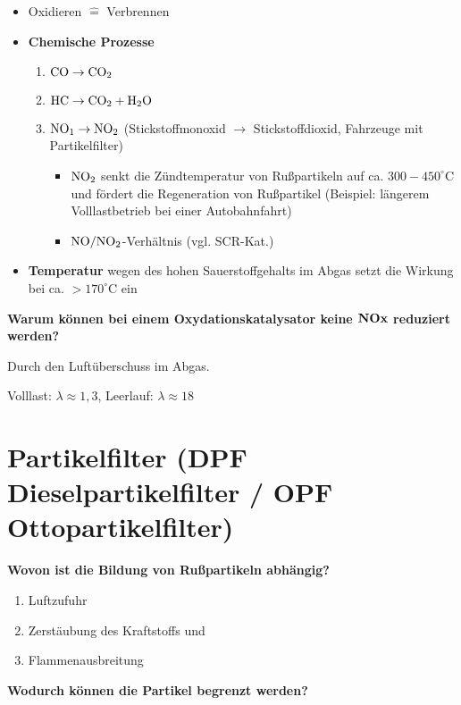 \begin{itemize}
\item
  Oxidieren $\hat{=}$ Verbrennen
\item
  \textbf{Chemische Prozesse}

  \begin{enumerate}
  \item
    $\ce{CO} \to \ce{CO2}$
  \item
    $\ce{HC} \to \ce{CO2 + H2O}$
  \item
    $\ce{NO1} \to \ce{NO2}$ (Stickstoffmonoxid $\to$
    Stickstoffdioxid, Fahrzeuge mit Partikelfilter)

    \begin{itemize}
    \item
      $\ce{NO2}$ senkt die Zündtemperatur von Rußpartikeln auf ca.
      $300 - 450^\circ\text{C}$ und fördert die Regeneration von
      Rußpartikel (Beispiel: längerem Volllastbetrieb bei einer
      Autobahnfahrt)
    \item
      $\ce{NO/NO2}$-Verhältnis (vgl. SCR-Kat.)
    \end{itemize}
  \end{enumerate}
\item
  \textbf{Temperatur} wegen des hohen Sauerstoffgehalts im Abgas setzt
  die Wirkung bei ca. $> 170^\circ\text{C}$ ein
\end{itemize}

\textbf{Warum können bei einem Oxydationskatalysator keine
$\ce{\bold{NOx}}$ reduziert werden?}

Durch den Luftüberschuss im Abgas.

Volllast: $\lambda \approx 1,3$, Leerlauf: $\lambda \approx 18$

\section{Partikelfilter (DPF Dieselpartikelfilter / OPF
Ottopartikelfilter)}\label{partikelfilter-dpf-dieselpartikelfilter-opf-ottopartikelfilter}

\textbf{Wovon ist die Bildung von Rußpartikeln abhängig?}

\begin{enumerate}
\item
  Luftzufuhr
\item
  Zerstäubung des Kraftstoffs und
\item
  Flammenausbreitung
\end{enumerate}

\textbf{Wodurch können die Partikel begrenzt werden?}

